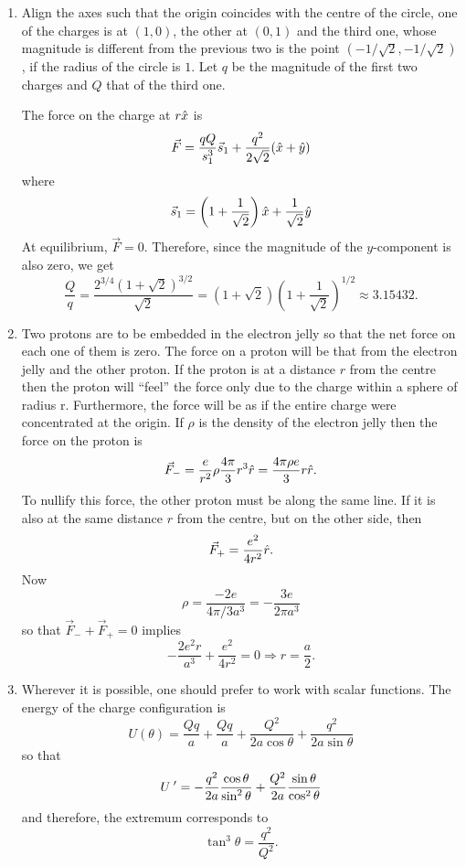\documentclass{article}
\begin{document}
\begin{enumerate}
\item Align the axes such that the origin coincides with the centre of the circle,
one of the charges is at $(1, 0)$, the other at $(0, 1)$ and the third one, whose
magnitude is different from the previous two is the point $(-1/\sqrt{2}, 
-1/\sqrt{2})$, if the radius of the circle is $1$. Let $q$ be the magnitude of
the first two charges and $Q$ that of the third one. 

The force on the charge at $r\hat{x}$ is
\[
\vec{F} = \frac{qQ}{s_1^3}\vec{s}_1 + \frac{q^2}{2\sqrt{2}}(\hat{x} + \hat{y})
\]
where
\[
\vec{s}_1 = \left(1 + \frac{1}{\sqrt{2}}\right)\hat{x} + \frac{1}{\sqrt{2}}\hat{y}
\]
At equilibrium, $\vec{F} = 0$. Therefore, since the magnitude of the $y$-component
is also zero, we get
\[
\frac{Q}{q} = \frac{2^{3/4}(1 + \sqrt{2})^{3/2}}{\sqrt{2}} = 
(1 + \sqrt{2})\left(1 + \frac{1}{\sqrt{2}}\right)^{1/2} \approx 3.15432.
\]

\item Two protons are to be embedded in the electron jelly so that the net force
on each one of them is zero. The force on a proton will be that from the electron
jelly and the other proton. If the proton is at a distance $r$ from the centre 
then the proton will ``feel'' the force only due to the charge within a sphere of
radius r. Furthermore, the force will be as if the entire charge were concentrated
at the origin. If $\rho$ is the density of the electron jelly then the force on 
the proton is
\[
\vec{F}_- = \frac{e}{r^2}\rho\frac{4\pi}{3}r^3\hat{r} = \frac{4\pi\rho e}{3}r\hat{r}.
\]
To nullify this force, the other proton must be along the same line. If it is also
at the same distance $r$ from the centre, but on the other side, then
\[
\vec{F}_+ = \frac{e^2}{4r^2}\hat{r}.
\]
Now 
\[
\rho = \frac{-2e}{4\pi/3 a^3} = -\frac{3e}{2\pi a^3}
\]
so that $\vec{F}_- + \vec{F}_+ = 0$ implies
\[
-\frac{2e^2r}{a^3} + \frac{e^2}{4r^2} = 0 \Rightarrow r = \frac{a}{2}.
\]

\item Wherever it is possible, one should prefer to work with scalar functions.
The energy of the charge configuration is
\[
U(\theta) = \frac{Qq}{a} + \frac{Qq}{a} + \frac{Q^2}{2a\cos\theta} + \frac{q^2}{2a\sin\theta}
\]
so that
\[
U^{\;\prime} = -\frac{q^2}{2a}\frac{\cos\theta}{\sin^2\theta} + 
\frac{Q^2}{2a}\frac{\sin\theta}{\cos^2\theta}
\]
and therefore, the extremum corresponds to
\[
\tan^3\theta = \frac{q^2}{Q^2}.
\]


\end{enumerate}
\end{document}
